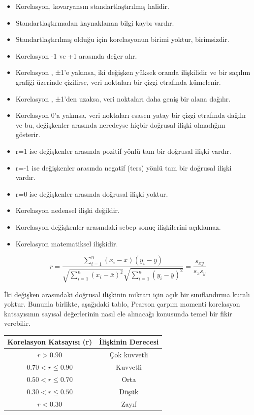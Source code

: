 \documentclass[
  letterpaper,
  DIV=11,
  numbers=noendperiod]{scrreprt}
\begin{document}
\begin{itemize}
\item
  Korelasyon, kovaryansın standartlaştırılmış halidir.
\item
  Standartlaştırmadan kaynaklanan bilgi kaybı vardır.
\item
  Standartlaştırılmış olduğu için korelasyonun birimi yoktur,
  birimsizdir.
\item
  Korelasyon -1 ve +1 arasında değer alır.
\item
  Korelasyon , ±1'e yakınsa, iki değişken yüksek oranda ilişkilidir ve
  bir saçılım grafiği üzerinde çizilirse, veri noktaları bir çizgi
  etrafında kümelenir.
\item
  Korelasyon , ±1'den uzaksa, veri noktaları daha geniş bir alana
  dağılır.
\item
  Korelasyon 0'a yakınsa, veri noktaları esasen yatay bir çizgi
  etrafında dağılır ve bu, değişkenler arasında neredeyse hiçbir
  doğrusal ilişki olmadığını gösterir.
\item
  r=1 ise değişkenler arasında pozitif yönlü tam bir doğrusal ilişki
  vardır.
\item
  r=-1 ise değişkenler arasında negatif (ters) yönlü tam bir doğrusal
  ilişki vardır.
\item
  r=0 ise değişkenler arasında doğrusal ilişki yoktur.
\item
  Korelasyon nedensel ilişki değildir.
\item
  Korelasyon değişkenler arasındaki sebep sonuç ilişkilerini açıklamaz.
\item
  Korelasyon matematiksel ilişkidir.
\end{itemize}

\[ r=\frac{\sum_{i=1}^n(x_i - \bar{x})(y_i - \bar{y})}{\sqrt{\sum_{i=1}^n(x_i-\bar{x})^2}\sqrt{\sum_{i=1}^n(y_i-\bar{y})^2}} = \frac{s_{xy}}{s_xs_y} \]

İki değişken arasındaki doğrusal ilişkinin miktarı için açık bir
sınıflandırma kuralı yoktur. Bununla birlikte, aşağıdaki tablo, Pearson
çarpım momenti korelasyon katsayısının sayısal değerlerinin nasıl ele
alınacağı konusunda temel bir fikir verebilir.

\begin{longtable}[]{@{}cc@{}}
\toprule\noalign{}
Korelasyon Katsayısı (r) & İlişkinin Derecesi \\
\midrule\noalign{}
\endhead
\bottomrule\noalign{}
\endlastfoot
\(r > 0.90\) & Çok kuvvetli \\
\(0.70 < r\le 0.90\) & Kuvvetli \\
\(0.50 < r\le 0.70\) & Orta \\
\(0.30 < r\le 0.50\) & Düşük \\
\(r < 0.30\) & Zayıf \\
\end{longtable}
\end{document}
